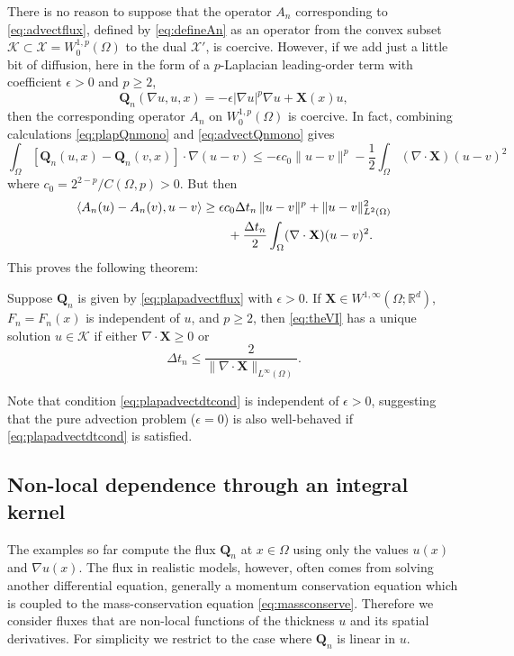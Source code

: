 \documentclass[final,leqno,onefignum,onetabnum]{siamltex1213bueler}
\newcommand\bQ{\mathbf{Q}}
\newcommand\bX{\mathbf{X}}
\newcommand{\Div}{\nabla\cdot}
\newcommand\eps{\epsilon}
\renewcommand{\grad}{\nabla}
\newcommand{\ip}[2]{\ensuremath{\left<#1,#2\right>}}
\newcommand\RR{\mathbb{R}}
\begin{document}
There is no reason to suppose that the operator $A_n$ corresponding to \eqref{eq:advectflux}, defined by \eqref{eq:defineAn} as an operator from the convex subset $\mathcal{K} \subset \mathcal{X} = W_0^{1,p}(\Omega)$ to the dual $\mathcal{X}'$, is coercive.  However, if we add just a little bit of diffusion, here in the form of a $p$-Laplacian leading-order term with coefficient $\eps>0$ and $p\ge 2$,
\begin{equation}
  \bQ_n(\grad u,u,x) = -\eps |\grad u|^p \grad u + \bX(x) u,   \label{eq:plapadvectflux}
\end{equation}
then the corresponding operator $A_n$ on $W_0^{1,p}(\Omega)$ is coercive.  In fact, combining calculations \eqref{eq:plapQnmono} and \eqref{eq:advectQnmono} gives
\begin{equation}
\int_\Omega \left[\bQ_n(u,x) - \bQ_n(v,x)\right] \cdot \grad (u - v) \le - \eps c_0 \|u-v\|^p - \frac{1}{2} \int_\Omega (\Div\bX) (u-v)^2
\end{equation}
where $c_0=2^{2-p}/C(\Omega,p)>0$.  But then
\begin{align}
\ip{A_n(u) - A_n(v)}{u-v} &\ge \eps c_0 \Delta t_n\, \|u-v\|^p + \|u-v\|_{L^2(\Omega)}^2 \\
  &\qquad + \frac{\Delta t_n}{2} \int_\Omega (\Div\bX) (u-v)^2. \notag
\end{align}
This proves the following theorem:

\begin{theorem}  \label{thm:plapadvectwellposed}  Suppose $\bQ_n$ is given by \eqref{eq:plapadvectflux} with $\eps>0$.  If $\bX \in W^{1,\infty}(\Omega;\RR^d)$, $F_n=F_n(x)$ is independent of $u$, and $p\ge 2$, then \eqref{eq:theVI} has a unique solution $u\in\mathcal{K}$ if either $\Div \bX \ge 0$ or
\begin{equation}
  \Delta t_n \le \frac{2}{\|\Div \bX\|_{L^\infty(\Omega)}}. \label{eq:plapadvectdtcond}
\end{equation}
\end{theorem}

Note that condition \eqref{eq:plapadvectdtcond} is independent of $\eps>0$, suggesting that the pure advection problem ($\eps = 0$) is also well-behaved if \eqref{eq:plapadvectdtcond} is satisfied.

\subsection{Non-local dependence through an integral kernel} \label{subsec:nonlocal}   The examples so far compute the flux $\bQ_n$ at $x\in\Omega$ using only the values $u(x)$ and $\grad u(x)$.  The flux in realistic models, however, often comes from solving another differential equation, generally a momentum conservation equation which is coupled to the mass-conservation equation \eqref{eq:massconserve}.  Therefore we consider fluxes that are non-local functions of the thickness $u$ and its spatial derivatives.  For simplicity we restrict to the case where $\bQ_n$ is linear in $u$.
\end{document}
